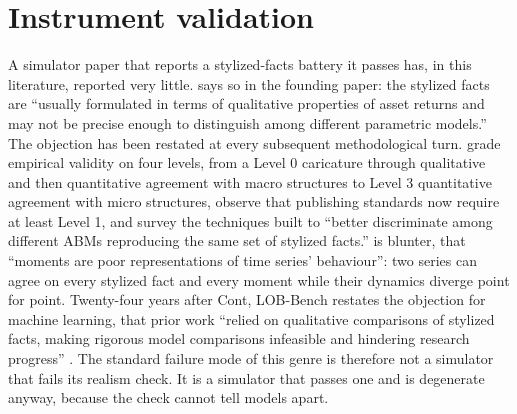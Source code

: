 \section{Instrument validation}\label{sec:validation}

A simulator paper that reports a stylized-facts battery it passes has, in this literature, reported very little.  says so in the founding paper: the stylized facts are ``usually formulated in terms of qualitative properties of asset returns and may not be precise enough to distinguish among different parametric models.'' The objection has been restated at every subsequent methodological turn.  grade empirical validity on four levels, from a Level 0 caricature through qualitative and then quantitative agreement with macro structures to Level 3 quantitative agreement with micro structures, observe that publishing standards now require at least Level 1, and survey the techniques built to ``better discriminate among different ABMs reproducing the same set of stylized facts.''  is blunter, that ``moments are poor representations of time series' behaviour'': two series can agree on every stylized fact and every moment while their dynamics diverge point for point. Twenty-four years after Cont, LOB-Bench restates the objection for machine learning, that prior work ``relied on qualitative comparisons of stylized facts, making rigorous model comparisons infeasible and hindering research progress'' \citep{nagy2025lobbench}. The standard failure mode of this genre is therefore not a simulator that fails its realism check. It is a simulator that passes one and is degenerate anyway, because the check cannot tell models apart.

